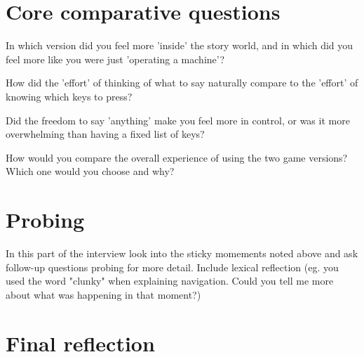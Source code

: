 \section{Core comparative questions}

\begin{QandA}
   \item In which version did you feel more 'inside' the story world, and in which did you feel more like you were just 'operating a machine'?
         \begin{answered}
         
         \end{answered}

   \item How did the 'effort' of thinking of what to say naturally compare to the 'effort' of knowing which keys to press?

         \begin{answered}
         
         \end{answered}

    \item Did the freedom to say 'anything' make you feel more in control, or was it more overwhelming than having a fixed list of keys?

         \begin{answered}
         
         \end{answered}
    \item How would you compare the overall experience of using the two game versions? Which one would you choose and why?

         \begin{answered}
         
         \end{answered}
\end{QandA}






\section{Probing}
In this part of the interview look into the sticky momements noted above and ask follow-up questions probing for more detail.
Include lexical reflection (eg. you used the word "clunky" when explaining navigation. Could you tell me more about what was happening
in that moment?)


\section{Final reflection}

